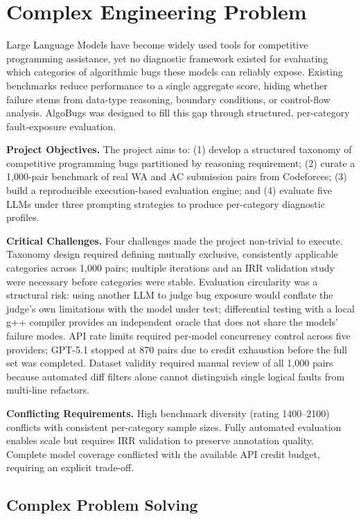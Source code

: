 \section{Complex Engineering Problem}

Large Language Models have become widely used tools for competitive programming assistance, yet no diagnostic framework existed for evaluating which categories of algorithmic bugs these models can reliably expose. Existing benchmarks reduce performance to a single aggregate score, hiding whether failure stems from data-type reasoning, boundary conditions, or control-flow analysis. AlgoBugs was designed to fill this gap through structured, per-category fault-exposure evaluation.

\noindent\textbf{Project Objectives.} The project aims to: (1) develop a structured taxonomy of competitive programming bugs partitioned by reasoning requirement; (2) curate a 1,000-pair benchmark of real WA and AC submission pairs from Codeforces; (3) build a reproducible execution-based evaluation engine; and (4) evaluate five LLMs under three prompting strategies to produce per-category diagnostic profiles.

\noindent\textbf{Critical Challenges.} Four challenges made the project non-trivial to execute. Taxonomy design required defining mutually exclusive, consistently applicable categories across 1,000 pairs; multiple iterations and an IRR validation study were necessary before categories were stable. Evaluation circularity was a structural risk: using another LLM to judge bug exposure would conflate the judge's own limitations with the model under test; differential testing with a local g++ compiler provides an independent oracle that does not share the models' failure modes. API rate limits required per-model concurrency control across five providers; GPT-5.1 stopped at 870 pairs due to credit exhaustion before the full set was completed. Dataset validity required manual review of all 1,000 pairs because automated diff filters alone cannot distinguish single logical faults from multi-line refactors.

\noindent\textbf{Conflicting Requirements.} High benchmark diversity (rating 1400--2100) conflicts with consistent per-category sample sizes. Fully automated evaluation enables scale but requires IRR validation to preserve annotation quality. Complete model coverage conflicted with the available API credit budget, requiring an explicit trade-off.

\subsection{Complex Problem Solving}

